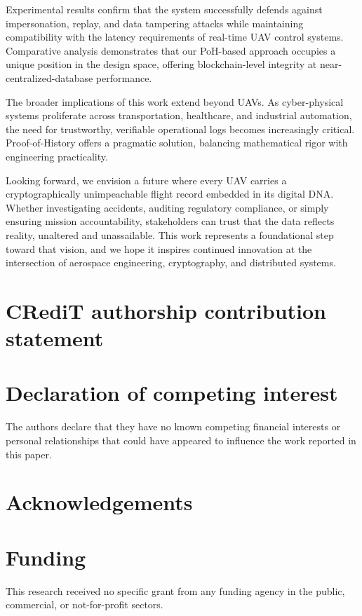 \documentclass[preprint,12pt]{elsarticle}
\begin{document}
Experimental results confirm that the system successfully defends against impersonation, replay, and data tampering attacks while maintaining compatibility with the latency requirements of real-time UAV control systems. Comparative analysis demonstrates that our PoH-based approach occupies a unique position in the design space, offering blockchain-level integrity at near-centralized-database performance.

The broader implications of this work extend beyond UAVs. As cyber-physical systems proliferate across transportation, healthcare, and industrial automation, the need for trustworthy, verifiable operational logs becomes increasingly critical. Proof-of-History offers a pragmatic solution, balancing mathematical rigor with engineering practicality.

Looking forward, we envision a future where every UAV carries a cryptographically unimpeachable flight record embedded in its digital DNA. Whether investigating accidents, auditing regulatory compliance, or simply ensuring mission accountability, stakeholders can trust that the data reflects reality, unaltered and unassailable. This work represents a foundational step toward that vision, and we hope it inspires continued innovation at the intersection of aerospace engineering, cryptography, and distributed systems.

\section*{CRediT authorship contribution statement}

\section*{Declaration of competing interest}
The authors declare that they have no known competing financial interests or personal relationships that could have appeared to influence the work reported in this paper.

\section*{Acknowledgements}

\section*{Funding}
This research received no specific grant from any funding agency in the public, commercial, or not-for-profit sectors.
\end{document}
